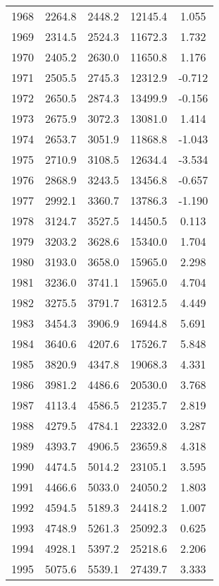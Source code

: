 \documentclass[10pt]{article}
\begin{document}
\begin{table}[H]
\begin{tabular}{lcccc}
        1968 & 2264.8 & 2448.2 & 12145.4 &   1.055 \\
        1969 & 2314.5 & 2524.3 & 11672.3 &   1.732 \\
        1970 & 2405.2 & 2630.0 & 11650.8 &   1.176 \\
        1971 & 2505.5 & 2745.3 & 12312.9 &  -0.712 \\
        1972 & 2650.5 & 2874.3 & 13499.9 &  -0.156 \\
        1973 & 2675.9 & 3072.3 & 13081.0 &   1.414 \\
        1974 & 2653.7 & 3051.9 & 11868.8 &  -1.043 \\
        1975 & 2710.9 & 3108.5 & 12634.4 &  -3.534 \\
        1976 & 2868.9 & 3243.5 & 13456.8 &  -0.657 \\
        1977 & 2992.1 & 3360.7 & 13786.3 &  -1.190 \\
        1978 & 3124.7 & 3527.5 & 14450.5 &   0.113 \\
        1979 & 3203.2 & 3628.6 & 15340.0 &   1.704 \\
        1980 & 3193.0 & 3658.0 & 15965.0 &   2.298 \\
        1981 & 3236.0 & 3741.1 & 15965.0 &   4.704 \\
        1982 & 3275.5 & 3791.7 & 16312.5 &   4.449 \\
        1983 & 3454.3 & 3906.9 & 16944.8 &   5.691 \\
        1984 & 3640.6 & 4207.6 & 17526.7 &   5.848 \\
        1985 & 3820.9 & 4347.8 & 19068.3 &   4.331 \\
        1986 & 3981.2 & 4486.6 & 20530.0 &   3.768 \\
        1987 & 4113.4 & 4586.5 & 21235.7 &   2.819 \\
        1988 & 4279.5 & 4784.1 & 22332.0 &   3.287 \\
        1989 & 4393.7 & 4906.5 & 23659.8 &   4.318 \\
        1990 & 4474.5 & 5014.2 & 23105.1 &   3.595 \\
        1991 & 4466.6 & 5033.0 & 24050.2 &   1.803 \\
        1992 & 4594.5 & 5189.3 & 24418.2 &   1.007 \\
        1993 & 4748.9 & 5261.3 & 25092.3 &   0.625 \\
        1994 & 4928.1 & 5397.2 & 25218.6 &   2.206 \\
        1995 & 5075.6 & 5539.1 & 27439.7 &   3.333 \\

\end{tabular}
\end{table}
\end{document}
